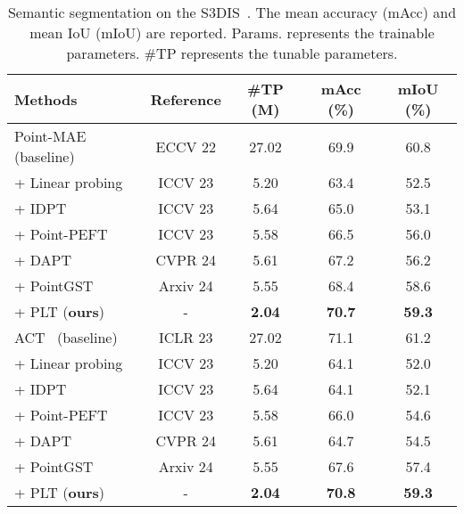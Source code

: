 \begin{table}
  \centering
  \scriptsize
  \setlength{\tabcolsep}{1.5mm}
  \caption{Semantic segmentation on the S3DIS~\cite{armeni20163d}. The
    mean accuracy (mAcc) and mean IoU (mIoU) are reported.
    Params. represents the trainable parameters. \#TP represents the tunable parameters.}
    \vspace{-10pt}
    \begin{tabular}{lcccc}
    \toprule
    Methods & Reference & \#TP (M)& mAcc (\%) & mIoU (\%) \\
    \midrule
    Point-MAE~\cite{pang2022masked} (baseline) &  ECCV 22 & 27.02 & 69.9 & 60.8 \\ 
    + Linear probing & ICCV 23 & 5.20  & 63.4  & 52.5  \\
    + IDPT~\cite{zha2023instance} & ICCV 23 & 5.64  & 65.0  & 53.1  \\
    + Point-PEFT~\cite{tang2024point} & ICCV 23 & 5.58  & 66.5  & 56.0  \\
    + DAPT~\cite{zhou2024dynamic} & CVPR 24 & 5.61  & 67.2 & 56.2 \\
    + PointGST~\cite{liang2024parameter} & Arxiv 24 & 5.55  & 68.4 & 58.6 \\
    \rowcolor{linecolor!40}+ PLT (\textbf{ours})& - & \textbf{2.04}  & \textbf{70.7} & \textbf{59.3} \\
    \midrule
    ACT~\cite{dong2022autoencoders} (baseline) &  ICLR 23 & 27.02 & 71.1 & 61.2 \\ 
    + Linear probing & ICCV 23 & 5.20  & 64.1  & 52.0  \\
    + IDPT~\cite{zha2023instance} & ICCV 23 & 5.64  & 64.1  & 52.1  \\
    + Point-PEFT~\cite{tang2024point} & ICCV 23 & 5.58  & 66.0  & 54.6  \\
    + DAPT~\cite{zhou2024dynamic} & CVPR 24 & 5.61  & 64.7 & 54.5 \\
    + PointGST~\cite{liang2024parameter} & Arxiv 24 & 5.55  & 67.6 & 57.4 \\
    \rowcolor{linecolor!40}+ PLT (\textbf{ours})& - & \textbf{2.04}  & \textbf{70.8} & \textbf{59.3} \\
    \bottomrule
    \end{tabular}
  \label{tab:semantic_segmentation}
\end{table}